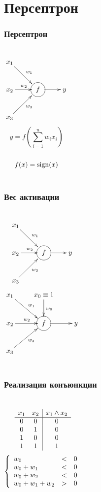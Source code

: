 \documentclass[24pt,pdf,hyperref={unicode}]{beamer}
\begin{document}
\section{Персептрон}

\begin{frame}\frametitle{Персептрон}
\begin{columns}
$$
\xymatrix
{
x_1 \ar@{->}[rd]^{w_1} \\
x_2 \ar@{->}[r]^{w_2} & *++[Fo]{f} \ar@{->}[r] & y\\
x_3 \ar@{->}[ru]_{w_3} \\
}
$$
$$
y=f\left(\sum_{i=1}^{n}w_ix_i\right)
$$\\[1cm]
$$
f(x)={\rm sign}(x)
$$
\end{columns}
\end{frame}


\begin{frame}\frametitle{Вес активации}
\begin{columns}
$$
\xymatrix
{
x_1 \ar@{->}[rd]^{w_1} \\
x_2 \ar@{->}[r]^{w_2} & *++[Fo]{f} \ar@{->}[r] & y\\
x_3 \ar@{->}[ru]_{w_3} \\
}
$$
$$
\xymatrix
{
x_1 \ar@{->}[rd]^{w_1} & x_0\equiv 1 \ar@{->}[d]^{w_0}\\
x_2 \ar@{->}[r]^{w_2} & *++[Fo]{f} \ar@{->}[r] & y\\
x_3 \ar@{->}[ru]_{w_3} \\
}
$$
\end{columns}
\end{frame}

\begin{frame}\frametitle{Реализация конъюнкции}
\begin{columns}
$$
\begin{array}{c c | c}
x_1 & x_2 & x_1\wedge x_2 \\
\hline
0 & 0 & 0 \\
0 & 1 & 0 \\
1 & 0 & 0 \\
1 & 1 & 1 \\
\end{array}
$$
$$
\left\{
\begin{array}{l l l l l l}
 w_0       & < & 0 \\
 w_0 + w_1 & < & 0 \\
 w_0 + w_2 & < & 0 \\
 w_0 + w_1 + w_2 & > & 0 \\
\end{array}
\right.
$$\\[1cm]
\end{columns}
\end{frame}
\end{document}
